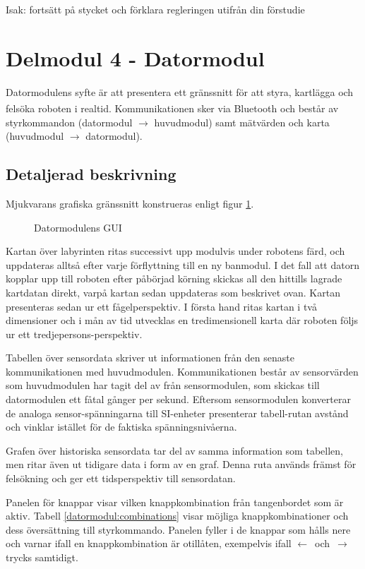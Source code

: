 \documentclass[11pt]{article}
\begin{document}
\begin{flushleft}
Isak: fortsätt på stycket och förklara regleringen utifrån din förstudie

\pagebreak
\section{Delmodul 4 - Datormodul}
Datormodulens syfte är att presentera ett gränssnitt för att styra, kartlägga och felsöka roboten i realtid. Kommunikationen sker via Bluetooth\textsuperscript{\circledR} och består av styrkommandon (datormodul $\rightarrow$ huvudmodul) samt mätvärden och karta (huvudmodul $\rightarrow$ datormodul). 

\subsection{Detaljerad beskrivning}
Mjukvarans grafiska gränssnitt konstrueras enligt figur \ref{datormodul:software}.

\begin{figure}[htbp]
\centering
\noindent\resizebox{.5\linewidth}{!}{
	}
	\caption{Datormodulens GUI \label{datormodul:software}}	
\end{figure}

Kartan över labyrinten ritas successivt upp modulvis under robotens färd, och uppdateras alltså efter varje förflyttning till en ny banmodul. I det fall att datorn kopplar upp till roboten efter påbörjad körning skickas all den hittills lagrade kartdatan direkt, varpå kartan sedan uppdateras som beskrivet ovan. Kartan presenteras sedan ur ett fågelperspektiv. I första hand ritas kartan i två dimensioner och i mån av tid utvecklas en tredimensionell karta där roboten följs ur ett tredjepersons-perspektiv. 

Tabellen över sensordata skriver ut informationen från den senaste kommunikationen med huvudmodulen. Kommunikationen består av sensorvärden som huvudmodulen har tagit del av från sensormodulen, som skickas till datormodulen ett fåtal gånger per sekund. Eftersom sensormodulen konverterar de analoga sensor-spänningarna till SI-enheter presenterar tabell-rutan avstånd och vinklar istället för de faktiska spänningsnivåerna. 

Grafen över historiska sensordata tar del av samma information som tabellen, men ritar även ut tidigare data i form av en graf. Denna ruta används främst för felsökning och ger ett tidsperspektiv till sensordatan.

Panelen för knappar visar vilken knappkombination från tangenbordet som är aktiv. Tabell \ref{datormodul:combinations} visar möjliga knappkombinationer och dess översättning till styrkommando. Panelen fyller i de knappar som hålls nere och varnar ifall en knappkombination är otillåten, exempelvis ifall \mbox{$\leftarrow$ och $\rightarrow$} trycks samtidigt.


\end{flushleft}
\end{document}
